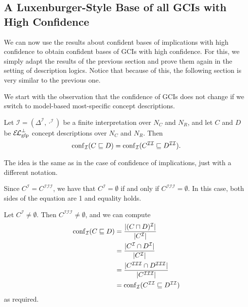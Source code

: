 \subsection{A Luxenburger-Style Base of all GCIs with High Confidence}
\label{sec:first-base}

We can now use the results about confident bases of implications with high confidence to
obtain confident bases of GCIs with high confidence.  For this, we simply adapt the
results of the previous section and prove them again in the setting of description logics.
Notice that because of this, the following section is very similar to the previous one.

We start with the observation that the confidence of GCIs does not change if we switch to
model-based most-specific concept descriptions.

\begin{Lemma}
  \label{lem:confidence-stays-under-mmsc}
  Let $\mathcal{I} = (\Delta^{\mathcal{I}}, \cdot^{\mathcal{I}})$ be a finite
  interpretation over $N_C$ and $N_R$, and let $C$ and $D$ be $\ELgfpbot$ concept
  descriptions over $N_{C}$ and $N_{R}$.  Then
  \begin{equation*}
    \operatorname{conf}_{\mathcal{I}}( C \sqsubseteq D ) = \operatorname{conf}_{\mathcal{I}}(
    C^{\mathcal{I}\mathcal{I}} \sqsubseteq D^{\mathcal{I}\mathcal{I}}).
  \end{equation*}
\end{Lemma}
\begin{Proof}
  The idea is the same as in the case of confidence of implications, just with a different
  notation.

  Since $C^{\mathcal{I}} = C^{\mathcal{I}\mathcal{I}\mathcal{I}}$, we have that
  $C^{\mathcal{I}} = \emptyset$ if and only if $C^{\mathcal{I}\mathcal{I}\mathcal{I}} =
  \emptyset$.  In this case, both sides of the equation are 1 and equality holds.

  Let $C^{\mathcal{I}} \neq \emptyset$.  Then $C^{\mathcal{I}\mathcal{I}\mathcal{I}} \neq
  \emptyset$, and we can compute
  \begin{align*}
    \operatorname{conf}_{\mathcal{I}}( C \sqsubseteq D )
    &= \frac{ \lvert (C \sqcap D)^{\mathcal{I}} \rvert }{ \lvert C^{\mathcal{I}} \rvert } \\
    &= \frac{ \lvert C^{\mathcal{I}} \cap D^{\mathcal{I}} \rvert }{ \lvert C^{\mathcal{I}} \rvert }
    \\
    &= \frac{ \lvert C^{\mathcal{I}\mathcal{I}\mathcal{I}} \cap
        D^{\mathcal{I}\mathcal{I}\mathcal{I}} \rvert }{ \lvert
        C^{\mathcal{I}\mathcal{I}\mathcal{I}} \rvert } \\
    &= \operatorname{conf}_{\mathcal{I}}( C^{\mathcal{I}\mathcal{I}} \sqsubseteq
    D^{\mathcal{I}\mathcal{I}} )
  \end{align*}
  as required.
\end{Proof}

